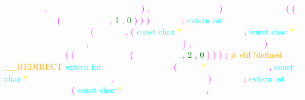 \textcolor{white}{\_\_format} 
\textcolor{magenta}{,} 
\textcolor{white}{\_\_gnuc\_va\_list} 
\textcolor{white}{\_\_arg} 
\textcolor{magenta}{)} 
\textcolor{magenta}{,} 
\textcolor{white}{\_\_isoc99\_vscanf} 
\textcolor{magenta}{)} 
\textcolor{white}{\_\_attribute\_\_} 
\textcolor{magenta}{(} 
\textcolor{magenta}{(} 
\textcolor{white}{\_\_format\_\_} 
\textcolor{magenta}{(} 
\textcolor{white}{\_\_scanf\_\_} 
\textcolor{magenta}{,} 
\textcolor{green}{1} 
\textcolor{magenta}{,} 
\textcolor{green}{0} 
\textcolor{magenta}{)} 
\textcolor{magenta}{)} 
\textcolor{magenta}{)} 
\textcolor{white}{\_\_wur} 
\textcolor{magenta}{;} 
\textcolor{cyan}{extern} 
\textcolor{cyan}{int} 
\textcolor{white}{\_\_REDIRECT\_NTH} 
\textcolor{magenta}{(} 
\textcolor{white}{vsscanf} 
\textcolor{magenta}{,} 
\textcolor{magenta}{(} 
\textcolor{cyan}{const} 
\textcolor{cyan}{char} 
\textcolor{yellow}{*} 
\textcolor{white}{\_\_restrict} 
\textcolor{white}{\_\_s} 
\textcolor{magenta}{,} 
\textcolor{cyan}{const} 
\textcolor{cyan}{char} 
\textcolor{yellow}{*} 
\textcolor{white}{\_\_restrict} 
\textcolor{white}{\_\_format} 
\textcolor{magenta}{,} 
\textcolor{white}{\_\_gnuc\_va\_list} 
\textcolor{white}{\_\_arg} 
\textcolor{magenta}{)} 
\textcolor{magenta}{,} 
\textcolor{white}{\_\_isoc99\_vsscanf} 
\textcolor{magenta}{)} 
\textcolor{white}{\_\_attribute\_\_} 
\textcolor{magenta}{(} 
\textcolor{magenta}{(} 
\textcolor{white}{\_\_format\_\_} 
\textcolor{magenta}{(} 
\textcolor{white}{\_\_scanf\_\_} 
\textcolor{magenta}{,} 
\textcolor{green}{2} 
\textcolor{magenta}{,} 
\textcolor{green}{0} 
\textcolor{magenta}{)} 
\textcolor{magenta}{)} 
\textcolor{magenta}{)} 
\textcolor{magenta}{;} 
\textcolor{orange}{\# elif !defined \_\_REDIRECT} 
\textcolor{cyan}{extern} 
\textcolor{cyan}{int} 
\textcolor{white}{\_\_isoc99\_vfscanf} 
\textcolor{magenta}{(} 
\textcolor{white}{FILE} 
\textcolor{yellow}{*} 
\textcolor{white}{\_\_restrict} 
\textcolor{white}{\_\_s} 
\textcolor{magenta}{,} 
\textcolor{cyan}{const} 
\textcolor{cyan}{char} 
\textcolor{yellow}{*} 
\textcolor{white}{\_\_restrict} 
\textcolor{white}{\_\_format} 
\textcolor{magenta}{,} 
\textcolor{white}{\_\_gnuc\_va\_list} 
\textcolor{white}{\_\_arg} 
\textcolor{magenta}{)} 
\textcolor{white}{\_\_wur} 
\textcolor{magenta}{;} 
\textcolor{cyan}{extern} 
\textcolor{cyan}{int} 
\textcolor{white}{\_\_isoc99\_vscanf} 
\textcolor{magenta}{(} 
\textcolor{cyan}{const} 
\textcolor{cyan}{char} 
\textcolor{yellow}{*} 
\textcolor{white}{\_\_restrict} 
\textcolor{white}{\_\_format} 
\textcolor{magenta}{,} 
\textcolor{white}{\_\_gnuc\_va\_list} 
\textcolor{white}{\_\_arg} 
